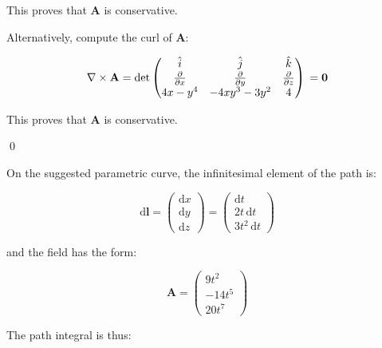 \documentclass[12pt]{article}
\begin{document}
This proves that $\mathbf{A}$ is conservative.

\begin{correction}
    Alternatively, compute the curl of $\mathbf{A}$:

    \begin{equation}
        \nabla \times \mathbf{A}
        =
        \det
        \begin{pmatrix}
            \hat{i}                     & \hat{j}                     & \hat{k}                     \\
            \frac{\partial}{\partial x} & \frac{\partial}{\partial y} & \frac{\partial}{\partial z} \\
            4x - y^{4}                  & -4xy^{3} - 3y^{2}           & 4
        \end{pmatrix} \\
        =
        \mathbf{0}
    \end{equation}

    This proves that $\mathbf{A}$ is conservative.
\end{correction}
\qed



On the suggested parametric curve, the infinitesimal element of the path is:

\begin{equation}
    \mathrm{d}\mathbf{l}
    =
    \begin{pmatrix}
        \mathrm{d}x \\
        \mathrm{d}y \\
        \mathrm{d}z
    \end{pmatrix}
    =
    \begin{pmatrix}
        \mathrm{d}t       \\
        2t \, \mathrm{d}t \\
        3t^{2} \, \mathrm{d}t
    \end{pmatrix}
\end{equation}

and the field has the form:

\begin{equation}
    \mathbf{A}
    =
    \begin{pmatrix}
        9t^{2}   \\
        -14t^{5} \\
        20t^{7}
    \end{pmatrix}
\end{equation}

The path integral is thus:
\end{document}
